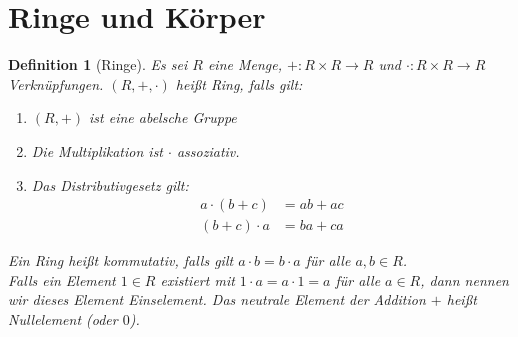 \documentclass{report}
\newcommand{\IN}[1]{\index{#1|BH}}
\theoremstyle{customrem}
\theoremstyle{customdef}
\newtheorem{definition}{Definition}[chapter]
\begin{document}
\section{Ringe und Körper}
	
	\begin{definition}[Ringe]
		\IN{Ring}
		Es sei $R$ eine Menge, $+ : R \times R \to R$ und $\cdot : R \times R \to R$ Verknüpfungen. $(R, +, \cdot)$ heißt Ring, falls gilt:
		\begin{enumerate}
			\item $(R, +)$ ist eine abelsche Gruppe
			\item Die Multiplikation ist $\cdot$ assoziativ.
			\item Das Distributivgesetz gilt:
			\begin{align*}
				a \cdot (b + c) &= ab + ac\\
				(b + c) \cdot a &= ba + ca
			\end{align*}
		\end{enumerate}
		Ein Ring heißt kommutativ, falls gilt $a \cdot b = b \cdot a$ für alle $a, b \in R$.\\
		Falls ein Element $1 \in R$ existiert mit $1 \cdot a = a \cdot 1 = a$ für alle $a \in R$, dann nennen wir dieses Element Einselement.
		Das neutrale Element der Addition $+$ heißt Nullelement (oder $0$).
	\end{definition}
\end{document}
